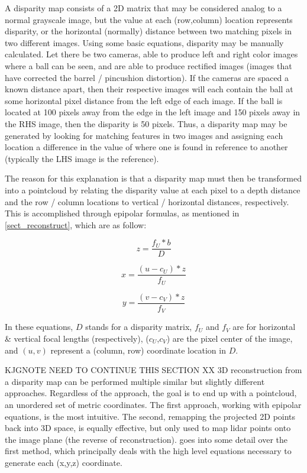 A disparity map consists of a 2D matrix that may be considered analog to a normal grayscale image, but the value at each (row,column) location represents disparity, or the horizontal (normally) distance between two matching pixels in two different images. Using some basic equations, disparity may be manually calculated. Let there be two cameras, able to produce left and right color images where a ball can be seen, and are able to produce rectified images (images that have corrected the barrel / pincushion distortion). If the cameras are spaced a known distance apart, then their respective images will each contain the ball at some horizontal pixel distance from the left edge of each image. If the ball is located at 100 pixels away from the edge in the left image and 150 pixels away in the RHS image, then the disparity is 50 pixels. Thus, a disparity map may be generated by looking for matching features in two images and assigning each location a difference in the value of where one is found in reference to another (typically the LHS image is the reference).

The reason for this explanation is that a disparity map must then be transformed into a pointcloud by relating the disparity value at each pixel to a depth distance and the row / column locations to vertical / horizontal distances, respectively. This is accomplished through epipolar formulas, as mentioned in \ref{sect_reconstruct}, which are as follow:

\begin{equation}
z = \frac{f_U * b}{D}
\end{equation}

\begin{equation}
x = \frac{(u - c_U) * z}{f_U}
\end{equation}

\begin{equation}
y = \frac{(v - c_V) * z}{f_V}
\end{equation}

In these equations, $D$ stands for a disparity matrix, $f_U$ and $f_V$ are for horizontal \& vertical focal lengths (respectively), ($c_U$,$c_V$) are the pixel center of the image, and $(u,v)$ represent a (column, row) coordinate location in $D$.

KJGNOTE NEED TO CONTINUE THIS SECTION XX
3D reconstruction from a disparity map can be performed multiple similar but slightly different approaches. Regardless of the approach, the goal is to end up with a pointcloud, an unordered set of metric coordinates. The first approach, working with epipolar equations, is the most intuitive. The second, remapping the projected 2D points back into 3D space, is equally effective, but only used to map lidar points onto the image plane (the reverse of reconstruction). \cite{szeliski_computer_2010} goes into some detail over the first method, which principally deals with the high level equations necessary to generate each (x,y,z) coordinate.

